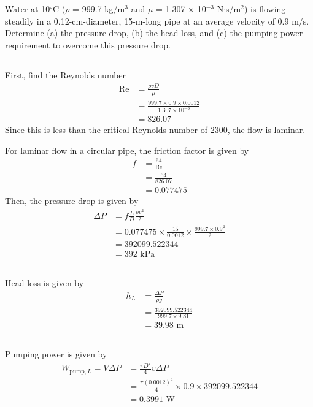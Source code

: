 \section{}

Water at 10$^{\circ}$C ($\rho$ = 999.7 kg/m$^3$ and $\mu$ = 1.307 $\times$ 10$^{-3}$ N$\cdot$s/m$^2$) is 
flowing steadily in a 0.12-cm-diameter, 15-m-long pipe at an average velocity of 0.9 m/s. 
Determine (a) the pressure drop, (b) the head loss, and (c) the pumping power requirement to overcome this pressure drop.

\subsection{}

First, find the Reynolds number
\begin{align*}
    \text{Re} &= \frac{\rho v D}{\mu} \\
    &= \frac{999.7 \times 0.9 \times 0.0012}{1.307 \times 10^{-3}} \\
    &= 826.07
\end{align*}
Since this is less than the critical Reynolds number of 2300, the flow is laminar.

For laminar flow in a circular pipe, the friction factor is given by
\begin{align*}
    f &= \frac{64}{\text{Re}} \\
    &= \frac{64}{826.07} \\
    &= 0.077475
\end{align*}
Then, the pressure drop is given by
\begin{align*}
    \Delta P &= f \frac{L}{D} \frac{\rho v^2}{2} \\
    &= 0.077475 \times \frac{15}{0.0012} \times \frac{999.7 \times 0.9^2}{2} \\
    &= 392099.522344 \\
    &= \boxed{392 \text{ kPa}}
\end{align*}

\subsection{}
Head loss is given by
\begin{align*}
    h_L &= \frac{\Delta P}{\rho g} \\
    &= \frac{392099.522344}{999.7 \times 9.81} \\
    &= \boxed{39.98 \text{ m}}
\end{align*}

\subsection{}
Pumping power is given by
\begin{align*}
    \dot{W}_{\text{pump}, L} = \dot{V}\Delta P &= \frac{\pi D^2}{4} v \Delta P \\
    &= \frac{\pi (0.0012)^2}{4} \times 0.9 \times 392099.522344 \\
    &= \boxed{0.3991 \text{ W}}
\end{align*}
